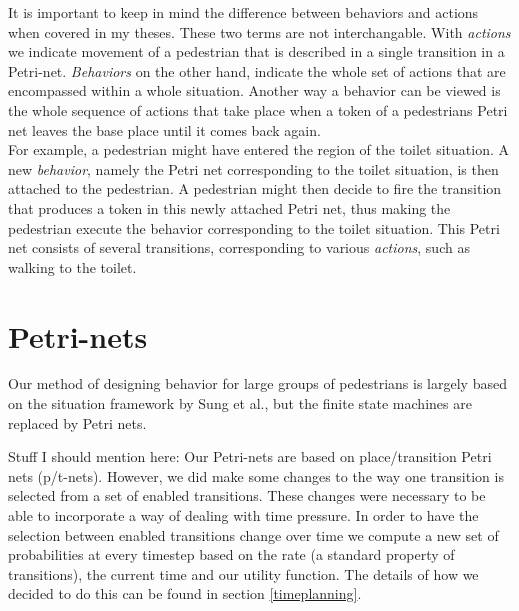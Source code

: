 \documentclass[11pt, a4paper]{book}
\begin{document}
It is important to keep in mind the difference between behaviors and actions when covered in my theses. These two terms are not interchangable. With \emph{actions} we indicate movement of a pedestrian that is described in a single transition in a Petri-net. \emph{Behaviors} on the other hand, indicate the whole set of actions that are encompassed within a whole situation. Another way a behavior can be viewed is the whole sequence of actions that take place when a token of a pedestrians Petri net leaves the base place until it comes back again. \\
For example, a pedestrian might have entered the region of the toilet situation. A new \emph{behavior}, namely the Petri net corresponding to the toilet situation, is then attached to the pedestrian. A pedestrian might then decide to fire the transition that produces a token in this newly attached Petri net, thus making the pedestrian execute the behavior corresponding to the toilet situation. This Petri net consists of several transitions, corresponding to various \emph{actions}, such as walking to the toilet.


\section{Petri-nets}
Our method of designing behavior for large groups of pedestrians is largely based on the situation framework by Sung et al., but the finite state machines are replaced by Petri nets.

Stuff I should mention here:
Our Petri-nets are based on place/transition Petri nets (p/t-nets). However, we did make some changes to the way one transition is selected from a set of enabled transitions. These changes were necessary to be able to incorporate a way of dealing with time pressure. In order to have the selection between enabled transitions change over time we compute a new set of probabilities at every timestep based on the rate (a standard property of transitions), the current time and our utility function. The details of how we decided to do this can be found in section \ref{timeplanning}.
\end{document}
